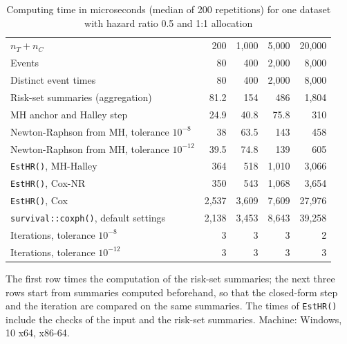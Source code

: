 \begin{table}
\caption{Computing time in microseconds (median of 200 repetitions) for one dataset with hazard ratio 0.5 and 1:1 allocation}
\label{tab:timing}
\centering
\footnotesize
\begin{tabular}{lrrrr}
\toprule
$n_T + n_C$ & 200 & 1,000 & 5,000 & 20,000 \\
Events & 80 & 400 & 2,000 & 8,000 \\
Distinct event times & 80 & 400 & 2,000 & 8,000 \\
\midrule
Risk-set summaries (aggregation) & 81.2 & 154 & 486 & 1,804 \\
MH anchor and Halley step & 24.9 & 40.8 & 75.8 & 310 \\
Newton-Raphson from MH, tolerance $10^{-8}$ & 38 & 63.5 & 143 & 458 \\
Newton-Raphson from MH, tolerance $10^{-12}$ & 39.5 & 74.8 & 139 & 605 \\
\texttt{EstHR()}, MH-Halley & 364 & 518 & 1,010 & 3,066 \\
\texttt{EstHR()}, Cox-NR & 350 & 543 & 1,068 & 3,654 \\
\texttt{EstHR()}, Cox & 2,537 & 3,609 & 7,609 & 27,976 \\
\texttt{survival::coxph()}, default settings & 2,138 & 3,453 & 8,643 & 39,258 \\
\midrule
Iterations, tolerance $10^{-8}$ & 3 & 3 & 3 & 2 \\
Iterations, tolerance $10^{-12}$ & 3 & 3 & 3 & 3 \\
\bottomrule
\end{tabular}
\par\smallskip
{\footnotesize The first row times the computation of the risk-set summaries; the next three rows start from summaries computed beforehand, so that the closed-form step and the iteration are compared on the same summaries. The times of \texttt{EstHR()} include the checks of the input and the risk-set summaries. Machine: Windows, 10 x64, x86-64.\par}
\end{table}
